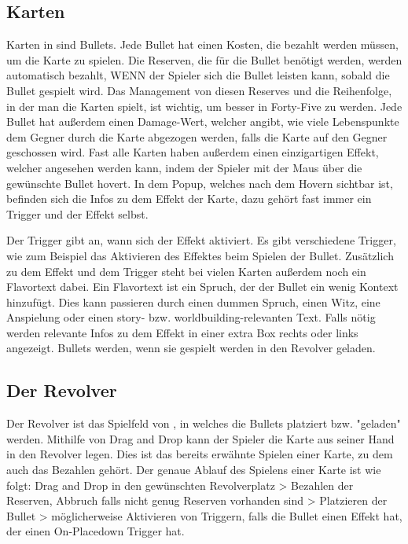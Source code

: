\subsection{Karten}\label{Karten}
Karten in \FF sind Bullets. Jede Bullet hat einen Kosten, die bezahlt werden müssen, um die Karte zu spielen.
Die Reserven, die für die Bullet benötigt werden, werden automatisch bezahlt, WENN der Spieler sich die Bullet leisten kann, sobald die Bullet gespielt wird.
Das Management von diesen Reserves und die Reihenfolge, in der man die Karten spielt, ist wichtig, um besser in Forty-Five zu werden. %
Jede Bullet hat außerdem einen Damage-Wert, welcher angibt, wie viele Lebenspunkte dem Gegner durch die Karte abgezogen werden,
falls die Karte auf den Gegner geschossen wird. Fast alle Karten haben außerdem einen einzigartigen Effekt,
welcher angesehen werden kann, indem der Spieler mit der Maus über die gewünschte Bullet hovert.
In dem Popup, welches nach dem Hovern sichtbar ist, befinden sich die Infos zu dem Effekt der Karte,
dazu gehört fast immer ein Trigger und der Effekt selbst.


Der Trigger gibt an, wann sich der Effekt aktiviert. Es gibt verschiedene Trigger, wie zum Beispiel das Aktivieren des Effektes beim Spielen der Bullet. %
Zusätzlich zu dem Effekt und dem Trigger steht bei vielen Karten außerdem noch ein Flavortext dabei.
Ein Flavortext ist ein Spruch, der der Bullet ein wenig Kontext hinzufügt.
Dies kann passieren durch einen dummen Spruch, einen Witz, eine Anspielung oder einen story- bzw. worldbuilding-relevanten Text.
Falls nötig werden relevante Infos zu dem Effekt in einer extra Box rechts oder links angezeigt.
Bullets werden, wenn sie gespielt werden in den Revolver geladen.

\subsection{Der Revolver}\label{der_revolver}
Der Revolver ist das Spielfeld von \FF, in welches die Bullets platziert bzw. "geladen" werden.
Mithilfe von Drag and Drop kann der Spieler die Karte aus seiner Hand in den Revolver legen.
Dies ist das bereits erwähnte Spielen einer Karte, zu dem auch das Bezahlen gehört.
Der genaue Ablauf des Spielens einer Karte ist wie folgt:
Drag and Drop in den gewünschten Revolverplatz > Bezahlen der Reserven, Abbruch falls nicht genug Reserven vorhanden sind > Platzieren der Bullet > möglicherweise Aktivieren von Triggern, falls die Bullet einen Effekt hat, der einen On-Placedown Trigger hat.


